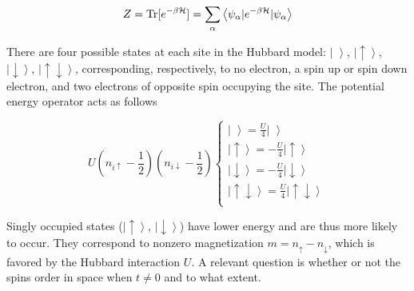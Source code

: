\begin{equation}\label{eq:z_asEigen}
Z = \operatorname{Tr} [ e^{-\beta \mathcal{H} } ]= \sum_\alpha \left\langle \psi_\alpha | e^{-\beta \mathcal{H} } | \psi_\alpha \right\rangle
\end{equation}

There are four possible states at each site in the Hubbard model: $\left| \,\, \right\rangle$, $\left|\uparrow \right\rangle$, $\left|\downarrow\right \rangle$, $\left|\uparrow \downarrow \right\rangle $, corresponding, respectively, to no electron, a spin up or spin down electron, and two electrons of opposite spin occupying the site.
The potential energy operator acts as follows

\begin{equation}
U (n_{i\uparrow} - \frac{1}{2} ) ( n_{i\downarrow} - \frac{1}{2} ) 
\begin{cases}
\left| \,\, \right\rangle = \frac{U}{4} \left| \,\, \right\rangle \\
\left|\uparrow \right\rangle = -\frac{U}{4} \left|\uparrow \right\rangle \\
\left|\downarrow\right \rangle = -\frac{U}{4} \left|\downarrow\right \rangle \\
\left|\uparrow \downarrow \right\rangle = \frac{U}{4} \left|\uparrow \downarrow \right\rangle \\
\end{cases}
\end{equation}

Singly occupied states ($\left|\uparrow \right\rangle$, $\left|\downarrow\right \rangle$) have lower energy and are thus more likely to occur.
They correspond to nonzero magnetization $m = n_{\uparrow} - n_{\downarrow}$, which is favored by the Hubbard interaction $U$.
A relevant question is whether or not the spins order in space when $t \neq 0$ and to what extent.

